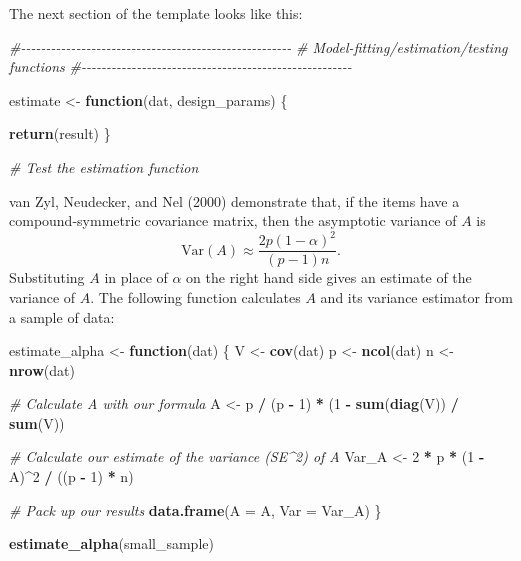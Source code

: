 \documentclass[
]{book}
\newenvironment{Shaded}{\begin{snugshade}}{\end{snugshade}}
\newcommand{\AttributeTok}[1]{\textcolor[rgb]{0.13,0.29,0.53}{#1}}
\newcommand{\CommentTok}[1]{\textcolor[rgb]{0.56,0.35,0.01}{\textit{#1}}}
\newcommand{\ControlFlowTok}[1]{\textcolor[rgb]{0.13,0.29,0.53}{\textbf{#1}}}
\newcommand{\DecValTok}[1]{\textcolor[rgb]{0.00,0.00,0.81}{#1}}
\newcommand{\FunctionTok}[1]{\textcolor[rgb]{0.13,0.29,0.53}{\textbf{#1}}}
\newcommand{\NormalTok}[1]{#1}
\newcommand{\OtherTok}[1]{\textcolor[rgb]{0.56,0.35,0.01}{#1}}
\newcommand{\SpecialCharTok}[1]{\textcolor[rgb]{0.81,0.36,0.00}{\textbf{#1}}}
\begin{document}
The next section of the template looks like this:

\begin{Shaded}
\begin{Highlighting}[]
\CommentTok{\#{-}{-}{-}{-}{-}{-}{-}{-}{-}{-}{-}{-}{-}{-}{-}{-}{-}{-}{-}{-}{-}{-}{-}{-}{-}{-}{-}{-}{-}{-}{-}{-}{-}{-}{-}{-}{-}{-}{-}{-}{-}{-}{-}{-}{-}{-}{-}{-}{-}{-}{-}{-}{-}{-}}
\CommentTok{\# Model{-}fitting/estimation/testing functions}
\CommentTok{\#{-}{-}{-}{-}{-}{-}{-}{-}{-}{-}{-}{-}{-}{-}{-}{-}{-}{-}{-}{-}{-}{-}{-}{-}{-}{-}{-}{-}{-}{-}{-}{-}{-}{-}{-}{-}{-}{-}{-}{-}{-}{-}{-}{-}{-}{-}{-}{-}{-}{-}{-}{-}{-}{-}}

\NormalTok{estimate }\OtherTok{\textless{}{-}} \ControlFlowTok{function}\NormalTok{(dat, design\_params) \{}

  \FunctionTok{return}\NormalTok{(result)}
\NormalTok{\}}

\CommentTok{\# Test the estimation function}
\end{Highlighting}
\end{Shaded}

van Zyl, Neudecker, and Nel (2000) demonstrate that, if the items have a compound-symmetric covariance matrix, then the asymptotic variance of \(A\) is
\[
\text{Var}(A) \approx \frac{2p(1 - \alpha)^2}{(p - 1) n}.
\]
Substituting \(A\) in place of \(\alpha\) on the right hand side gives an estimate of the variance of \(A\). The following function calculates \(A\) and its variance estimator from a sample of data:

\begin{Shaded}
\begin{Highlighting}[]
\NormalTok{estimate\_alpha }\OtherTok{\textless{}{-}} \ControlFlowTok{function}\NormalTok{(dat) \{}
\NormalTok{  V }\OtherTok{\textless{}{-}} \FunctionTok{cov}\NormalTok{(dat)}
\NormalTok{  p }\OtherTok{\textless{}{-}} \FunctionTok{ncol}\NormalTok{(dat)}
\NormalTok{  n }\OtherTok{\textless{}{-}} \FunctionTok{nrow}\NormalTok{(dat)}
  
  \CommentTok{\# Calculate A with our formula}
\NormalTok{  A }\OtherTok{\textless{}{-}}\NormalTok{ p }\SpecialCharTok{/}\NormalTok{ (p }\SpecialCharTok{{-}} \DecValTok{1}\NormalTok{) }\SpecialCharTok{*}\NormalTok{ (}\DecValTok{1} \SpecialCharTok{{-}} \FunctionTok{sum}\NormalTok{(}\FunctionTok{diag}\NormalTok{(V)) }\SpecialCharTok{/} \FunctionTok{sum}\NormalTok{(V))}
  
  \CommentTok{\# Calculate our estimate of the variance (SE\^{}2) of A}
\NormalTok{  Var\_A }\OtherTok{\textless{}{-}} \DecValTok{2} \SpecialCharTok{*}\NormalTok{ p }\SpecialCharTok{*}\NormalTok{ (}\DecValTok{1} \SpecialCharTok{{-}}\NormalTok{ A)}\SpecialCharTok{\^{}}\DecValTok{2} \SpecialCharTok{/}\NormalTok{ ((p }\SpecialCharTok{{-}} \DecValTok{1}\NormalTok{) }\SpecialCharTok{*}\NormalTok{ n)}
  
  \CommentTok{\# Pack up our results}
  \FunctionTok{data.frame}\NormalTok{(}\AttributeTok{A =}\NormalTok{ A, }\AttributeTok{Var =}\NormalTok{ Var\_A)}
\NormalTok{\}}

\FunctionTok{estimate\_alpha}\NormalTok{(small\_sample)}
\end{Highlighting}
\end{Shaded}
\end{document}
